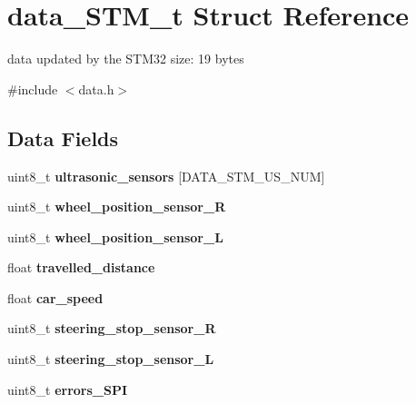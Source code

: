 \hypertarget{structdata___s_t_m__t}{}\section{data\+\_\+\+S\+T\+M\+\_\+t Struct Reference}
\label{structdata___s_t_m__t}


data updated by the S\+T\+M32 size\+: 19 bytes  




{\ttfamily \#include $<$data.\+h$>$}

\subsection*{Data Fields}
\begin{DoxyCompactItemize}
\item 
\hypertarget{structdata___s_t_m__t_a2b584d14638921f686e91193ab59937c}{}\label{structdata___s_t_m__t_a2b584d14638921f686e91193ab59937c} 
uint8\+\_\+t {\bfseries ultrasonic\+\_\+sensors} \mbox{[}D\+A\+T\+A\+\_\+\+S\+T\+M\+\_\+\+U\+S\+\_\+\+N\+UM\mbox{]}
\item 
\hypertarget{structdata___s_t_m__t_a86c2662ee8ae8cef331de1a36285e9ee}{}\label{structdata___s_t_m__t_a86c2662ee8ae8cef331de1a36285e9ee} 
uint8\+\_\+t {\bfseries wheel\+\_\+position\+\_\+sensor\+\_\+R}
\item 
\hypertarget{structdata___s_t_m__t_a179ffd7182c86ef85d3a5bbd1acf3290}{}\label{structdata___s_t_m__t_a179ffd7182c86ef85d3a5bbd1acf3290} 
uint8\+\_\+t {\bfseries wheel\+\_\+position\+\_\+sensor\+\_\+L}
\item 
\hypertarget{structdata___s_t_m__t_ae80e8b57c0137231caeb56a150d46aa4}{}\label{structdata___s_t_m__t_ae80e8b57c0137231caeb56a150d46aa4} 
float {\bfseries travelled\+\_\+distance}
\item 
\hypertarget{structdata___s_t_m__t_a0698d95871bb093c21f1216ff752d9de}{}\label{structdata___s_t_m__t_a0698d95871bb093c21f1216ff752d9de} 
float {\bfseries car\+\_\+speed}
\item 
\hypertarget{structdata___s_t_m__t_ad64d7eb43c330d4d3bf79aa82210728a}{}\label{structdata___s_t_m__t_ad64d7eb43c330d4d3bf79aa82210728a} 
uint8\+\_\+t {\bfseries steering\+\_\+stop\+\_\+sensor\+\_\+R}
\item 
\hypertarget{structdata___s_t_m__t_a7c8c5193fdfd26fc6cb6b7c78608903d}{}\label{structdata___s_t_m__t_a7c8c5193fdfd26fc6cb6b7c78608903d} 
uint8\+\_\+t {\bfseries steering\+\_\+stop\+\_\+sensor\+\_\+L}
\item 
\hypertarget{structdata___s_t_m__t_aaab013b9618bb1e5045806ff4ff47602}{}\label{structdata___s_t_m__t_aaab013b9618bb1e5045806ff4ff47602} 
uint8\+\_\+t {\bfseries errors\+\_\+\+S\+PI}
\end{DoxyCompactItemize}


